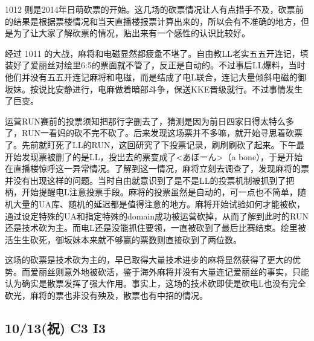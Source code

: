1012 则是2014年日萌砍票的开始。这几场的砍票情况让人有点措手不及，砍票前的结果是根据票楼情况和当天直播楼报票计算出来的，所以会有不准确的地方，但是为了让大家了解砍票的情况，贴出来有一个感性的认识比较好。

经过 1011 的大战，麻将和电磁显然都疲惫不堪了。自由教LL老实五五开连记，填装好了爱丽丝对绘里6:5的票面就不管了，反正是自动的。不过事后LL爆料，当时他们并没有五五开连记麻将和电磁，而是结成了电L联合，连记大量倾斜电磁的御坂妹。按说比安静进行，电麻做着暗部斗争，保送KKE晋级就行。不过事情发生了巨变。

运营RUN赛前的投票须知把那行字删去了，猜测是因为前日四家日得太特么多了，RUN一看妈的砍不完不砍了。后来发现这场票并不多嘛，就开始寻思着砍票了。先前就盯死了LL的RUN，这回研究了下投票记录，刷刷刷砍了起来。下午最开始发现票被删了的是LL，投出去的票变成了<あぼーん>（a bone），于是开始在直播楼惊呼这一异常情况。了解到这一情况，麻将立刻去调查了，发现麻将的票并没有出现这样的问题。当时自由就意识到了是不是LL的投票机制被抓到了把柄，开始提醒电L注意投票手段。麻将的投票虽然是自动的，可一点也不简单，随机大量的UA库、随机的延迟都是值得注意的地方。麻将开始试验如何才能被砍，通过设定特殊的UA和指定特殊的domain成功被运营砍掉，从而了解到此时的RUN还是技术砍为主。而电L还是没能抓住要领，一直被砍到了最后比赛结束。绘里被活生生砍死，御坂妹本来就不够赢的票数则直接砍到了两位数。

这场的砍票是技术砍为主的，早已取得大量技术进步的麻将显然获得了更大的优势。而爱丽丝则意外地被砍活，鉴于海外麻将并没有大量连记爱丽丝的事实，只能认为确实是散票发挥了强大作用。事实上，这场的技术砍即使是砍电L也没有完全砍光，麻将的票也非没有殃及，散票也有中招的情况。

\subsection{10/13(祝) C3 I3}


